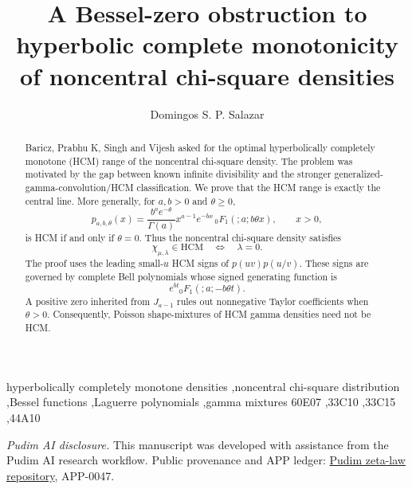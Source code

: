 ﻿\documentclass[preprint,12pt,authoryear]{elsarticle}
\newcommand{\HCM}{\mathrm{HCM}}
\begin{document}
\begin{frontmatter}

\title{A Bessel-zero obstruction to hyperbolic complete monotonicity of noncentral chi-square densities}

\author[addr1]{Domingos S. P. Salazar}
\address[addr1]{Unidade de Educa\c{c}\~ao a Dist\^ancia e Tecnologia,
Universidade Federal Rural de Pernambuco,
52171-900 Recife, Pernambuco, Brazil}

\begin{abstract}
Baricz, Prabhu K, Singh and Vijesh asked for the optimal hyperbolically completely monotone (HCM) range of the noncentral chi-square density.  The problem was motivated by the gap between known infinite divisibility and the stronger generalized-gamma-convolution/HCM classification.  We prove that the HCM range is exactly the central line.  More generally, for \(a,b>0\) and \(\theta\ge0\),
\begin{equation}
p_{a,b,\theta}(x)
=
\frac{b^a e^{-\theta}}{\Gamma(a)}
x^{a-1}e^{-bx}\,{}_0F_1(;a;b\theta x),
\qquad x>0,
\end{equation}
is HCM if and only if \(\theta=0\).  Thus the noncentral chi-square density satisfies
\begin{equation}
\chi_{\mu,\lambda}\in\HCM
\quad\Longleftrightarrow\quad
\lambda=0.
\end{equation}
The proof uses the leading small-\(u\) HCM signs of \(p(uv)p(u/v)\).  These signs are governed by complete Bell polynomials whose signed generating function is
\begin{equation}
e^{bt}{}_0F_1(;a;-b\theta t).
\end{equation}
A positive zero inherited from \(J_{a-1}\) rules out nonnegative Taylor coefficients when \(\theta>0\).  Consequently, Poisson shape-mixtures of HCM gamma densities need not be HCM.
\end{abstract}

\begin{keyword}
hyperbolically completely monotone densities \sep noncentral chi-square distribution
\sep Bessel functions \sep Laguerre polynomials \sep gamma mixtures
\MSC[2020] 60E07 \sep 33C10 \sep 33C15 \sep 44A10
\end{keyword}

\end{frontmatter}

\begingroup
\small
\noindent\textit{Pudim AI disclosure.}
This manuscript was developed with assistance from the Pudim AI research workflow.
Public provenance and APP ledger:
\href{https://github.com/pudim-project/pudim-ai-demo-zetalaw}{Pudim zeta-law repository}, APP-0047.
\par
\endgroup
\end{document}
